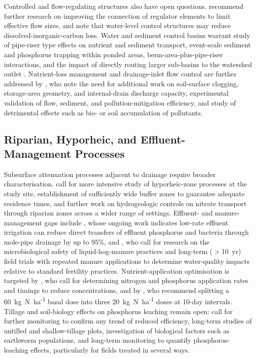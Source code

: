 Controlled and flow-regulating structures also have open questions. \textcite{Popek2021} recommend further research on improving the connection of regulator elements to limit effective flow sizes, and \textcite{Schilling2023} note that water-level control structures may reduce dissolved-inorganic-carbon loss. Water and sediment control basins warrant study of pipe-riser type effects on nutrient and sediment transport, event-scale sediment and phosphorus trapping within ponded areas, berm-area-plus-pipe-riser interactions, and the impact of directly routing larger sub-basins to the watershed outlet \parencite{Gupta2019}. Nutrient-loss management and drainage-inlet flow control are further addressed by \textcite{Nédélec2010}, who note the need for additional work on soil-surface clogging, storage-area geometry, and internal-drain discharge capacity, experimental validation of flow, sediment, and pollution-mitigation efficiency, and study of detrimental effects such as bio- or soil accumulation of pollutants.

\subsection{Riparian, Hyporheic, and Effluent-Management Processes}
Subsurface attenuation processes adjacent to drainage require broader characterisation. \textcite{Puckett2005} call for more intensive study of hyporheic-zone processes at the study site, establishment of sufficiently wide buffer zones to guarantee adequate residence times, and further work on hydrogeologic controls on nitrate transport through riparian zones across a wider range of settings. Effluent- and manure-management gaps include \textcite{Monaghan2007}, whose ongoing work indicates low-rate effluent irrigation can reduce direct transfers of effluent phosphorus and bacteria through mole-pipe drainage by up to 95\%, and \textcite{Gordon2005}, who call for research on the microbiological safety of liquid-hog-manure practices and long-term ($>$10~yr) field trials with repeated manure applications to determine water-quality impacts relative to standard fertility practices. Nutrient-application optimisation is targeted by \textcite{Farahani2020}, who call for determining nitrogen and phosphorus application rates and timings to reduce concentrations, and by \textcite{Singh2002}, who recommend splitting a 60~kg~N~ha\textsuperscript{-1} basal dose into three 20~kg~N~ha\textsuperscript{-1} doses at 10-day intervals. Tillage and soil-biology effects on phosphorus leaching remain open: \textcite{Ulén2018} call for further monitoring to confirm any trend of reduced efficiency, long-term studies of untilled and shallow-tillage plots, investigation of biological factors such as earthworm populations, and long-term monitoring to quantify phosphorus-leaching effects, particularly for fields treated in several ways.

